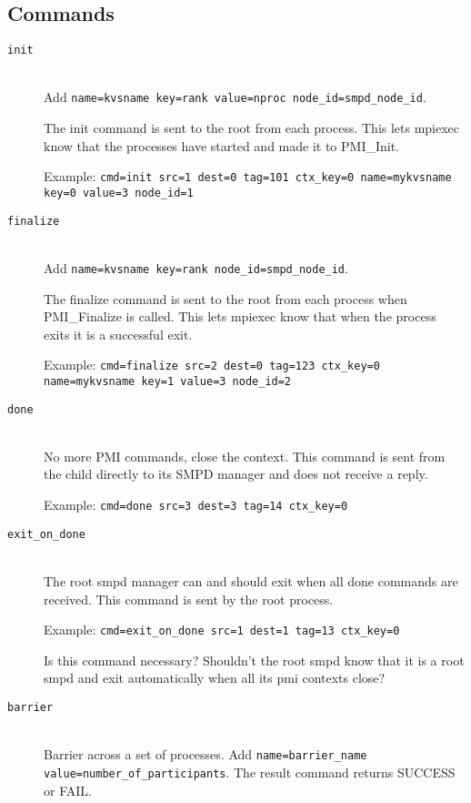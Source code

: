 \documentclass[dvipdfm,11pt]{article}
\begin{document}
\subsection{Commands}
\begin{description}
\item[\texttt{init}]\mbox{}\\
Add \texttt{name=kvsname
key=rank
value=nproc
node\_id=smpd\_node\_id}.

The init command is sent to the root from each process.  This lets mpiexec know
that the processes have started and made it to PMI\_Init.

Example: \texttt{cmd=init src=1 dest=0 tag=101 ctx\_key=0 name=mykvsname key=0 value=3 node\_id=1}
\item[\texttt{finalize}]\mbox{}\\
Add \texttt{name=kvsname
key=rank
node\_id=smpd\_node\_id}.

The finalize command is sent to the root from each process when PMI\_Finalize is called.
This lets mpiexec know that when the process exits it is a successful exit.

Example: \texttt{cmd=finalize src=2 dest=0 tag=123 ctx\_key=0 name=mykvsname key=1 value=3 node\_id=2}
\item[\texttt{done}]\mbox{}\\
No more PMI commands, close the context.  This command is sent from the 
child directly to its SMPD manager and does not receive a reply.

Example: \texttt{cmd=done src=3 dest=3 tag=14 ctx\_key=0}
\item[\texttt{exit\_on\_done}]\mbox{}\\
The root smpd manager can and should exit when all done commands are received.
This command is sent by the root process.

Example: \texttt{cmd=exit\_on\_done src=1 dest=1 tag=13 ctx\_key=0}

Is this command necessary?  Shouldn't the root smpd know that it is a root smpd
and exit automatically when all its pmi contexts close?
\item[\texttt{barrier}]\mbox{}\\
Barrier across a set of processes. 
Add \texttt{name=barrier\_name value=number\_of\_participants}.
The result command returns SUCCESS or FAIL.


\end{description}
\end{document}
